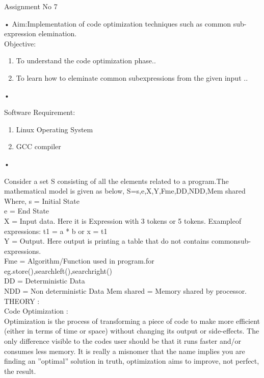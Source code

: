 \documentclass[11pt]{article}
\begin{document}
	\begin{center}
		\begin{Large}
			Assignment No 7
		\end{Large}
	\end{center}•
	Aim:Implementation of code optimization techniques such as common sub-expression elemination.\\
	
	\noindent
	Objective:
	\begin{enumerate}
		\item To understand the code optimization phase..
		\item To learn how to eleminate common subexpressions from the given input ..
	\end{enumerate}•
	
	\noindent
	Software Requirement:
	\begin{enumerate}
		\item Linux Operating System
		\item GCC compiler
	\end{enumerate}•
	
	\noindent
	Consider a set S consisting of all the elements related to a program.The mathematical model is given as below, S={s,e,X,Y,Fme,DD,NDD,Mem shared} Where, s = Initial State\\ e = End State\\
	X	= Input data. Here it is Expression with 3 tokens or 5 tokens. Exampleof expressions: t1 = a * b or x = t1\\
	Y	= Output. Here output is printing a table that do not contains commonsub-expressions.\\
	Fme = Algorithm/Function used in program.for eg.{store(),searchleft(),searchright()}\\
	DD = Deterministic Data\\
	NDD = Non deterministic Data Mem shared = Memory shared by processor.\\
	
	\noindent
	THEORY :\\
	Code Optimization :\\
	Optimization is the process of transforming a piece of code to make more efficient (either in terms of time or space) without changing its output or side-effects. The only difference visible to the codes user should be that it runs faster and/or consumes less memory. It is really a misnomer that the name implies you are finding an ”optimal” solution in truth, optimization aims to improve, not perfect, the result.\\
	
\end{document}
